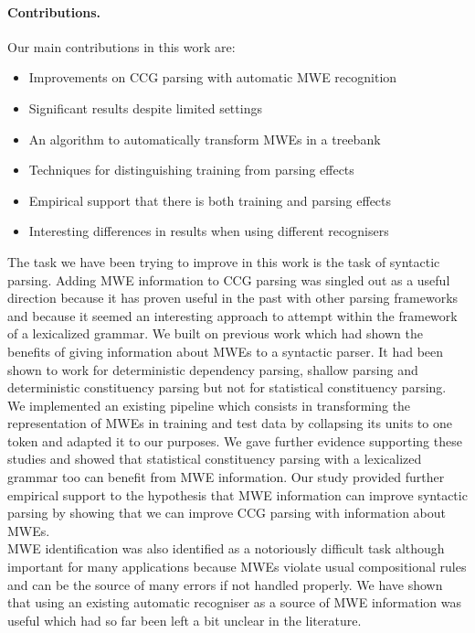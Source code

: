 \documentclass[output=paper]{LSP/langsci}
\begin{document}
\paragraph*{Contributions.}
Our main contributions in this work are:
\begin{itemize}
    \setlength\itemsep{0pt}
    \item Improvements on CCG parsing with automatic MWE recognition
    \item Significant results despite limited settings
    \item An algorithm to automatically transform MWEs in a treebank
    \item Techniques for distinguishing training from parsing effects
    \item Empirical support that there is both training and parsing effects
    \item Interesting differences in results when using different recognisers
\end{itemize}
\indent The task we have been trying to improve in this work is the task of syntactic parsing. Adding MWE information to CCG parsing was singled out as a useful direction because it has proven useful in the past with other parsing frameworks and because it seemed an interesting approach to attempt within the framework of a lexicalized grammar. We built on previous work which had shown the benefits of giving information about MWEs to a syntactic parser. It had been shown to work for deterministic dependency parsing, shallow parsing and deterministic constituency parsing but not for statistical constituency parsing. We implemented an existing pipeline which consists in transforming the representation of MWEs in training and test data by collapsing its units to one token and adapted it to our purposes. We gave further evidence supporting these studies and showed that statistical constituency parsing with a lexicalized grammar too can benefit from MWE information. Our study provided further empirical support to the hypothesis that MWE information can improve syntactic parsing by showing that we can improve CCG parsing with information about MWEs. \\
\indent MWE identification was also identified as a notoriously difficult task although important for many applications because MWEs violate usual compositional ru\-les and can be the source of many errors if not handled properly. We have shown that using an existing automatic recogniser as a source of MWE information was useful which had so far been left a bit unclear in the literature. \\
\end{document}
